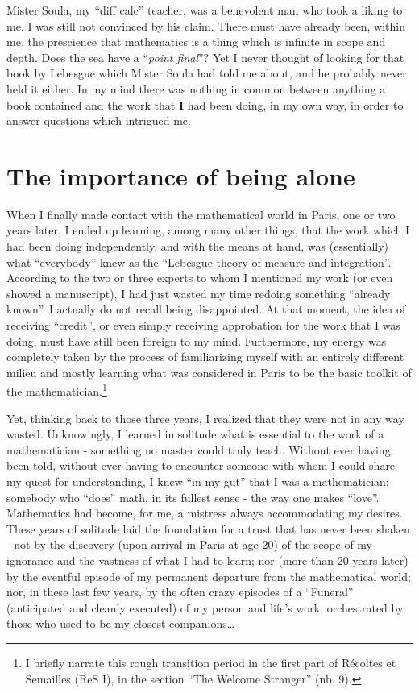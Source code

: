 Mister Soula, my ``diff calc'' teacher, was a benevolent man who took a liking to me. I
was still not convinced by his claim. 
There must have already been, within me, the
prescience that mathematics is a thing which is infinite in scope and depth. Does the sea
have a ``\emph{point final}''? Yet I never thought of looking for that book by Lebesgue
which Mister Soula had told me about, and he probably never held it either. 
In my mind there was nothing in common between anything a book contained and
the work that \textbf{I} had been doing, in my own way, in order to answer questions which 
intrigued me. 

\section{The importance of being alone}

When I finally made contact with the mathematical world in Paris, one or two years later,
I ended up learning, among many other things, that the work which I had been doing
independently, and with the means at hand, was (essentially) what ``everybody'' 
knew as the ``Lebesgue theory of measure and integration''. According to the two or three 
experts to whom I mentioned my work (or even showed a manuscript), I had just wasted my
time redoing something ``already known''. I actually do not recall being disappointed. 
At that moment, the idea of receiving ``credit'', or even simply receiving
approbation for the work that I was doing, must have still been foreign to my mind. 
Furthermore, my energy was completely taken by the process of familiarizing myself with an
entirely different milieu and mostly learning what was considered in Paris to be the basic
toolkit of the mathematician.\footnote{I briefly narrate this rough transition period in
the first part of  
R\'ecoltes et Semailles (ReS I), in the section ``The Welcome Stranger'' (nb. 9).}

Yet, thinking back to those three years, I realized that they were not in any way wasted.
Unknowingly, I learned in solitude what is essential 
to the work of a mathematician - something no master could 
truly teach. Without ever having been told, without ever having to encounter someone with
whom I could share my quest for understanding, I knew ``in my gut'' that I was a
mathematician: somebody who ``does'' math, in its fullest sense - the way one makes
``love''. Mathematics had become, for me, a mistress always 
accommodating my desires. These years of solitude laid the foundation for a trust that has
never been shaken - not by the discovery (upon arrival in Paris at age 20) of the scope of
my ignorance and the vastness of what I had to learn; nor (more than 20 years later) by
the eventful episode of my permanent departure from the mathematical world; nor, in these
last few years, by the often crazy episodes of a ``Funeral'' (anticipated 
and cleanly executed)
of my person and life's work, orchestrated by those who used to be my closest
companions\ldots 

